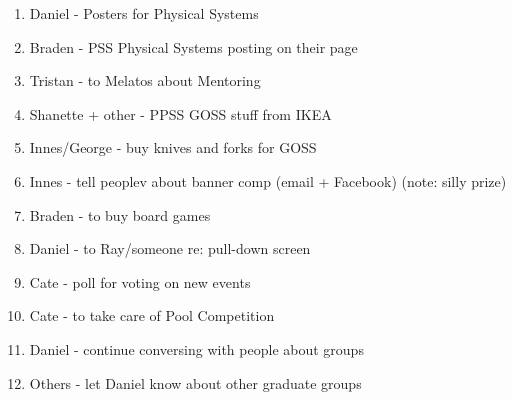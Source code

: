 \documentclass[a4paper,12pt]{article}
\begin{document}
\begin{enumerate}
\item Daniel - Posters for Physical Systems
\item Braden - PSS Physical Systems posting on their page
\item Tristan - to Melatos about Mentoring
\item Shanette + other - PPSS GOSS stuff from IKEA
\item Innes/George - buy knives and forks for GOSS
\item Innes - tell peoplev about banner comp (email + Facebook) (note: silly prize)
\item Braden - to buy board games
\item Daniel - to Ray/someone re: pull-down screen
\item Cate - poll for voting on new events
\item Cate - to take care of Pool Competition
\item Daniel - continue conversing with people about groups
\item Others - let Daniel know about other graduate groups
\end{enumerate}
\end{document}
